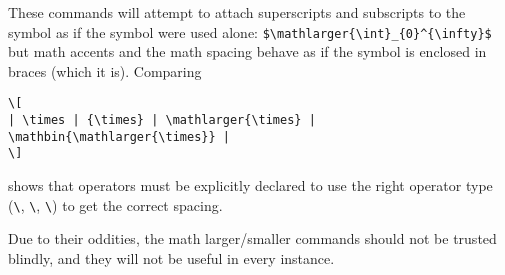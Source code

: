 \documentclass[pagesize=auto]{scrartcl}
\makeatletter
\newcommand*{\cs}[1]{\texttt{\textbackslash#1}}
\newcommand*{\cmd}[1]{\cs{\expandafter\@gobble\string#1}}
\makeatother
\begin{document}
These commands will attempt to attach superscripts and subscripts to the 
symbol as if the symbol were used alone: \verb+$\mathlarger{\int}_{0}^{\infty}$+
but math accents and the math spacing behave as if the symbol is enclosed
in braces (which it is).  Comparing 
%
\begin{flushleft}
  \footnotesize
\begin{verbatim}
\[
| \times | {\times} | \mathlarger{\times} | \mathbin{\mathlarger{\times}} |
\] 
\end{verbatim}
\end{flushleft}
%
shows that operators must be explicitly declared to use the right operator
type (\cmd{\mathrel}, \cmd{\mathbin}, \cmd{\mathop}) to get the correct spacing.

Due to their oddities, the math larger/smaller commands should not be 
trusted blindly, and they will not be useful in every instance.
\end{document}
